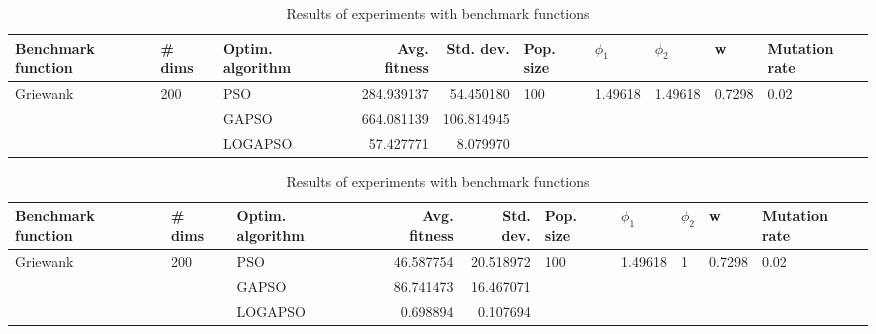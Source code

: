 \documentclass{article}
\begin{document}
\begin{table}
\centering
\caption{Results of experiments with benchmark functions}
\begin{tabular}{lllrrlllll}
\toprule
       Benchmark function &              \# dims & Optim. algorithm &  Avg. fitness &  Std. dev. &            Pop. size &               $\phi_{1}$ &               $\phi_{2}$ &                       w &         Mutation rate \\
\midrule
\multirow{3}{*}{Griewank} & \multirow{3}{*}{200} &              PSO &    284.939137 &  54.450180 & \multirow{3}{*}{100} & \multirow{3}{*}{1.49618} & \multirow{3}{*}{1.49618} & \multirow{3}{*}{0.7298} & \multirow{3}{*}{0.02} \\
                          &                      &            GAPSO &    664.081139 & 106.814945 &                      &                          &                          &                         &                       \\
                          &                      &          LOGAPSO &     57.427771 &   8.079970 &                      &                          &                          &                         &                       \\
\bottomrule
\end{tabular}
\end{table}
\begin{table}
\centering
\caption{Results of experiments with benchmark functions}
\begin{tabular}{lllrrlllll}
\toprule
       Benchmark function &              \# dims & Optim. algorithm &  Avg. fitness &  Std. dev. &            Pop. size &               $\phi_{1}$ &         $\phi_{2}$ &                       w &         Mutation rate \\
\midrule
\multirow{3}{*}{Griewank} & \multirow{3}{*}{200} &              PSO &     46.587754 &  20.518972 & \multirow{3}{*}{100} & \multirow{3}{*}{1.49618} & \multirow{3}{*}{1} & \multirow{3}{*}{0.7298} & \multirow{3}{*}{0.02} \\
                          &                      &            GAPSO &     86.741473 &  16.467071 &                      &                          &                    &                         &                       \\
                          &                      &          LOGAPSO &      0.698894 &   0.107694 &                      &                          &                    &                         &                       \\
\bottomrule
\end{tabular}
\end{table}
\end{document}
